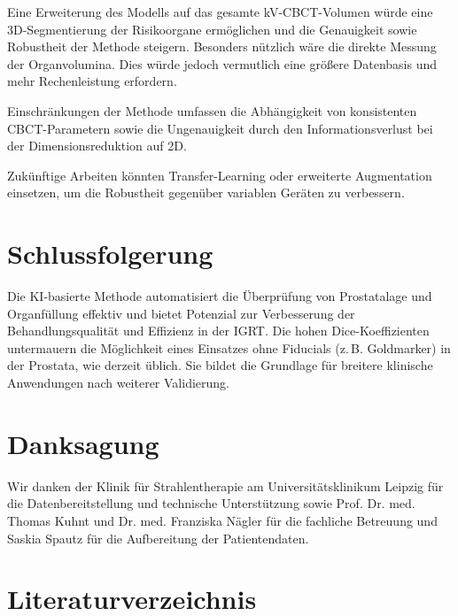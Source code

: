 \documentclass{article}
\begin{document}
Eine Erweiterung des Modells auf das gesamte kV-CBCT-Volumen würde eine
3D-Segmentierung der Risikoorgane ermöglichen und die Genauigkeit sowie
Robustheit der Methode steigern. Besonders nützlich wäre die direkte Messung der
Organvolumina. Dies würde jedoch vermutlich eine größere Datenbasis und mehr
Rechenleistung erfordern.

Einschränkungen der Methode umfassen die Abhängigkeit von konsistenten
CBCT-Para\-metern sowie die Ungenauigkeit durch den Informationsverlust bei der
Dimensionsreduktion auf 2D.

Zukünftige Arbeiten könnten Transfer-Learning oder erweiterte Augmentation
einsetzen, um die Robustheit gegenüber variablen Geräten zu verbessern.

\section{Schlussfolgerung}
Die KI-basierte Methode automatisiert die Überprüfung von Prostatalage und
Organfüllung effektiv und bietet Potenzial zur Verbesserung der
Behandlungsqualität und Effizienz in der IGRT. Die hohen Dice-Koeffizienten
untermauern die Möglichkeit eines Einsatzes ohne Fiducials (z.\,B. Goldmarker)
in der Prostata, wie derzeit üblich. Sie bildet die Grundlage für breitere
klinische Anwendungen nach weiterer Validierung.

\section{Danksagung}
Wir danken der Klinik für Strahlentherapie am Universitätsklinikum Leipzig für
die Datenbereitstellung und technische Unterstützung sowie Prof. Dr. med. Thomas
Kuhnt und Dr. med. Franziska Nägler für die fachliche Betreuung und Saskia
Spautz für die Aufbereitung der Patientendaten.

\section{Literaturverzeichnis}
 
 
\end{document}
